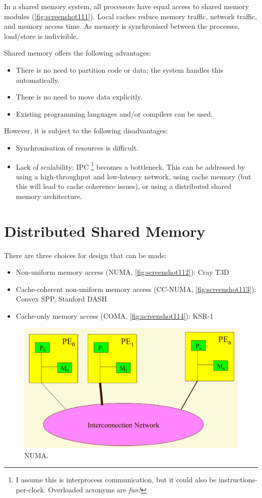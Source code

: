 In a shared memory system, all processors have equal access to shared memory modules (\autoref{fig:screenshot111}). Local caches reduce memory traffic, network traffic, and memory access time. As memory is synchronised between the processes, load/store is indivisible.

Shared memory offers the following advantages: \begin{itemize}
\item There is no need to partition code or data; the system handles this automatically.
\item There is no need to move data explicitly.
\item Existing programming languages and/or compilers can be used.
\end{itemize}

However, it is subject to the following disadvantages: \begin{itemize}
\item Synchronisation of resources is difficult.
\item Lack of scalability; IPC \footnote{I assume this is interprocess communication, but it could also be instructions-per-clock. Overloaded acronyms are \textit{fun!}} becomes a bottleneck. This can be addressed by using a high-throughput and low-latency network, using cache memory (but this will lead to cache coherence issues), or using a distributed shared memory architecture.
\end{itemize}

\section{Distributed Shared Memory}
There are three choices for design that can be made: \begin{itemize}
\item Non-uniform memory access (NUMA, \autoref{fig:screenshot112}): Cray T3D
\item Cache-coherent non-uniform memory access (CC-NUMA, \autoref{fig:screenshot113}): Convex SPP, Stanford DASH
\item Cache-only memory access (COMA, \autoref{fig:screenshot114}): KSR-1
\end{itemize}

\begin{figure}
\centering
\includegraphics[width=0.7\linewidth]{screenshot112}
\caption{NUMA.}
\label{fig:screenshot112}
\end{figure}

